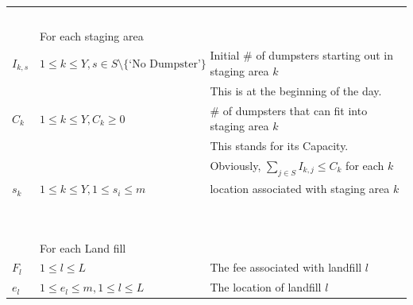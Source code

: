 \documentclass{article}
\begin{document}
\begin{tabular}{ l | l | l }
                               & $                                                           $  &                                                               \\
                               & For each staging area                                          &                                                               \\
  $I_{k, s}$                   & $ 1 \le k \le Y, s \in S \setminus \{\mbox{`No Dumpster'}\} $  &  Initial \# of dumpsters starting out in staging area $k$     \\
                               & $                                                           $  &  This is at the beginning of the day.                         \\
  $C_k$                        & $ 1 \le k \le Y, C_k \ge 0                                  $  &  \# of dumpsters that can fit into staging area $k$           \\
                               & $                                                           $  &  This stands for its Capacity.                                \\
                               & $                                                           $  & Obviously, $\sum_{j \in S} I_{k,j} \le C_k$ for each $k$      \\
  $s_k$                        & $ 1 \le k \le Y, 1 \le s_i \le m                            $  & location associated with staging area $k$                     \\
                               & $                                                           $  &                                                               \\
                               & $                                                           $  &                                                               \\
                               & For each Land fill                                           &                                                               \\
  $F_l$                        & $  1 \le l \le L                                            $  & The fee associated with landfill $l$                          \\
  $e_l$                        & $1 \le e_l \le m, 1 \le l \le L                             $  & The location of landfill $l$                                  \\ 
\end{tabular}
\end{document}
